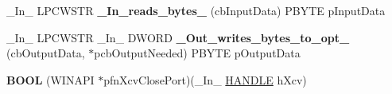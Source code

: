 \begin{DoxyCompactItemize}
\item 
\mbox{\label{struct___m_o_n_i_t_o_r_a6c5697a8289a98bf5eb68d8476e36671}} 
\+\_\+\+In\+\_\+ L\+P\+C\+W\+S\+TR {\bfseries \+\_\+\+In\+\_\+reads\+\_\+bytes\+\_\+} (cb\+Input\+Data) P\+B\+Y\+TE p\+Input\+Data
\item 
\mbox{\label{struct___m_o_n_i_t_o_r_a40eb94ea197047c11212369e5fee40e0}} 
\+\_\+\+In\+\_\+ L\+P\+C\+W\+S\+TR \+\_\+\+In\+\_\+ D\+W\+O\+RD {\bfseries \+\_\+\+Out\+\_\+writes\+\_\+bytes\+\_\+to\+\_\+opt\+\_\+} (cb\+Output\+Data, $\ast$pcb\+Output\+Needed) P\+B\+Y\+TE p\+Output\+Data
\item 
\mbox{\label{struct___m_o_n_i_t_o_r_a8b578836b0875ad044aa5c04bb50f365}} 
{\bfseries B\+O\+OL} (W\+I\+N\+A\+PI $\ast$pfn\+Xcv\+Close\+Port)(\+\_\+\+In\+\_\+ \hyperlink{interfacevoid}{H\+A\+N\+D\+LE} h\+Xcv)
\end{DoxyCompactItemize}
